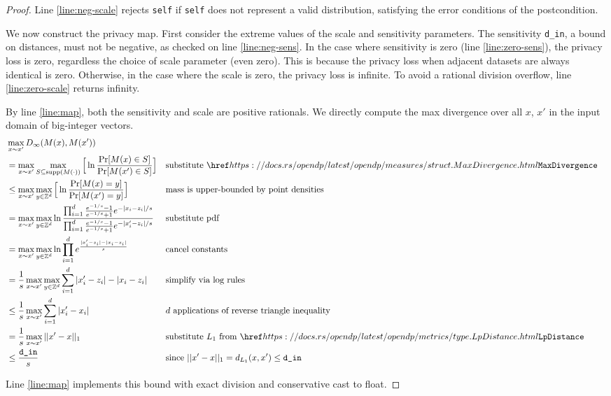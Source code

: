 \documentclass{article}
\begin{document}
\begin{proof}
    Line \ref{line:neg-scale} rejects \texttt{self} if \texttt{self} does not represent a valid distribution,
    satisfying the error conditions of the postcondition.

    We now construct the privacy map.
    First consider the extreme values of the scale and sensitivity parameters.
    The sensitivity \texttt{d\_in}, a bound on distances, must not be negative, as checked on line \ref{line:neg-sens}.
    In the case where sensitivity is zero (line \ref{line:zero-sens}), the privacy loss is zero, regardless the choice of scale parameter (even zero).
    This is because the privacy loss when adjacent datasets are always identical is zero.
    Otherwise, in the case where the scale is zero, the privacy loss is infinite.
    To avoid a rational division overflow, line \ref{line:zero-scale} returns infinity.

    By line \ref{line:map}, both the sensitivity and scale are positive rationals.
    We directly compute the max divergence over all $x$, $x'$ in the input domain of big-integer vectors.
    \begin{align}
        &\max_{x \sim x'} D_\infty(M(x), M(x')) \\
        &=\max_{x \sim x'} \max_{S \subseteq \textrm{supp}(M(\cdot))} \Big[\ln \dfrac{\Pr[M(x) \in S]}{\Pr[M(x') \in S]} \Big]
            &&\text{substitute } \rustdoc{measures/struct}{MaxDivergence} \\
        &\leq\max_{x \sim x'} \max_{y \in \mathbb{Z}^d} \Big[\ln \dfrac{\Pr[M(x) = y]}{\Pr[M(x') = y]} \Big]
            &&\text{mass is upper-bounded by point densities}\\
        &=\max_{x \sim x'} \max_{y \in \mathbb{Z}^d} \ln \dfrac{\prod_{i=1}^d \frac{e^{-1/s} - 1}{e^{-1/s} + 1} e^{-|x_i - z_i|/s}}{\prod_{i=1}^d\frac{e^{-1/s} - 1}{e^{-1/s} + 1} e^{-|x'_i-z_i|/s}}
            &&\text{substitute pdf}\\
        &=\max_{x \sim x'} \max_{y \in \mathbb{Z}^d} \ln \prod_{i=1}^d e^{\frac{|x'_i - z_i| - |x_i - z_i|}{s}}
            &&\text{cancel constants} \\
        &=\frac{1}{s}\max_{x \sim x'} \max_{y \in \mathbb{Z}^d} \sum_{i=1}^d|x'_i - z_i| - |x_i - z_i|
            &&\text{simplify via log rules}\\
        &\leq\frac{1}{s}\max_{x \sim x'} \sum_{i=1}^d|x'_i - x_i|
            &&d \text{ applications of reverse triangle inequality} \\
        &=\frac{1}{s}\max_{x \sim x'}||x' - x||_1
            &&\text{substitute } L_1 \text{ from } \rustdoc{metrics/type}{LpDistance} \\
        &\leq\frac{\texttt{d\_in}}{s}
            &&\text{since } ||x' - x||_1 = d_{L_1}(x, x') \leq \texttt{d\_in} \\
    \end{align}

    Line \ref{line:map} implements this bound with exact division and conservative cast to float.
\end{proof}
\end{document}
